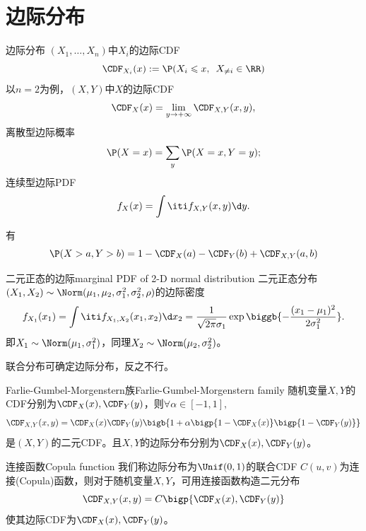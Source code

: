 \section{边际分布}

\begin{definition}{边际分布}{}
	$(X_1,\ldots,X_n)$中$X_i$的边际CDF
	\begin{equation}
		\CDF_{X_i}(x):=\P(X_i\leqslant x,\enspace X_{\neq i}\in\RR)
	\end{equation}
	以$n=2$为例，$(X,Y)$中$X$的边际CDF
	\[
		\CDF_X(x)=\lim_{y\to+\infty}\CDF_{X,Y}(x,y),
	\]
	离散型边际概率
	\[
		\P(X=x)=\sum_y\P(X=x,Y=y);
	\]
	连续型边际PDF
	\[
		f_X(x)=\int\iti f_{X,Y}(x,y)\d y.
	\]
\end{definition}

\begin{corollary}
	有 
	\[
		\P(X>a,Y>b)=1-\CDF_X(a)-\CDF_Y(b)+\CDF_{X,Y}(a,b)
	\]
\end{corollary}

\begin{example}{二元正态的边际}{marginal PDF of 2-D normal distribution}
	二元正态分布$(X_1,X_2)\sim\Norm(\mu_1,\mu_2,\sigma_1^2,\sigma_2^2,\rho)$的边际密度
	\[
		f_{X_1}(x_1)=\int\iti f_{X_1,X_2}(x_1,x_2)\d x_2=\frac1{\sqrt{2\pi}\sigma_1}\exp\biggb{-\frac{(x_1-\mu_1)^2}{2\sigma_1^2}}.
	\]
	即$X_1\sim\Norm(\mu_1,\sigma_1^2)$，同理$X_2\sim\Norm(\mu_2,\sigma_2^2)$。
\end{example}
\begin{remark}
	联合分布可确定边际分布，反之不行。
\end{remark}
\begin{example}{Farlie-Gumbel-Morgenstern族}{Farlie-Gumbel-Morgenstern family}
	随机变量$X,Y$的CDF分别为$\CDF_X(x),\CDF_Y(y)$，则$\forall\alpha\in[-1,1],$
	\begin{equation}
		\CDF_{X,Y}(x,y)=\CDF_X(x)\CDF_Y(y)\bigb{1+\alpha\bigp{1-\CDF_X(x)}\bigp{1-\CDF_Y(y)}}
	\end{equation}
	是$(X,Y)$的二元CDF。且$X,Y$的边际分布分别为$\CDF_X(x),\CDF_Y(y)$。
\end{example}
\begin{example}{连接函数}{Copula function}
	我们称边际分布为$\Unif(0,1)$的联合CDF $C(u,v)$为连接(Copula)函数，则对于随机变量$X,Y$，可用连接函数构造二元分布
	\begin{equation}
		\CDF_{X,Y}(x,y)=C\bigp{\CDF_X(x),\CDF_Y(y)}
	\end{equation}
	使其边际CDF为$\CDF_X(x),\CDF_Y(y)$。
\end{example}

